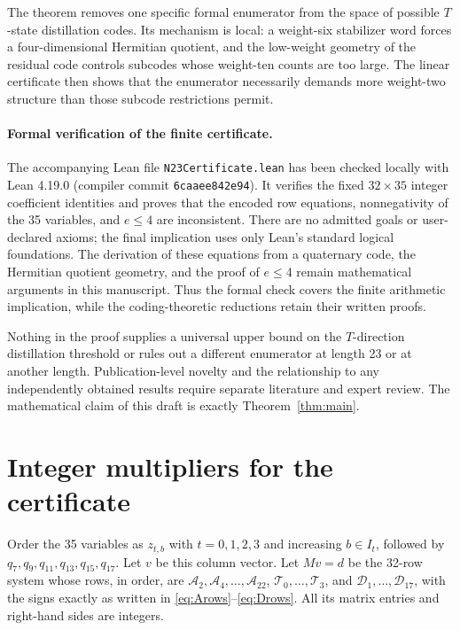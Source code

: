 \documentclass[11pt]{article}
\theoremstyle{remark}
\newcommand{\Arow}[1]{\mathcal A_{#1}}
\newcommand{\Trow}[1]{\mathcal T_{#1}}
\newcommand{\Drow}[1]{\mathcal D_{#1}}
\begin{document}
The theorem removes one specific formal enumerator from the space of
possible $T$-state distillation codes.  Its mechanism is local: a
weight-six stabilizer word forces a four-dimensional Hermitian quotient,
and the low-weight geometry of the residual code controls subcodes
whose weight-ten counts are too large.  The linear certificate then
shows that the enumerator necessarily demands more weight-two
structure than those subcode restrictions permit.

\paragraph{Formal verification of the finite certificate.}
The accompanying Lean file \texttt{N23Certificate.lean} has been checked
locally with Lean 4.19.0 (compiler commit \texttt{6caaee842e94}).
It verifies the fixed $32\times35$ integer coefficient identities and
proves that the encoded row equations, nonnegativity of the 35 variables,
and $e\leq4$ are inconsistent.  There are no admitted goals or
user-declared axioms; the final implication uses only Lean's standard
logical foundations.  The derivation of these equations from a
quaternary code, the Hermitian quotient geometry, and the proof of
$e\leq4$ remain mathematical arguments in this manuscript.
Thus the formal check covers the finite arithmetic implication,
while the coding-theoretic reductions retain their written proofs.

Nothing in the proof supplies a universal upper bound on the
$T$-direction distillation threshold or rules out a different enumerator
at length 23 or at another length.  Publication-level novelty and the
relationship to any independently obtained results require separate
literature and expert review.  The mathematical claim of this draft is
exactly Theorem~\ref{thm:main}.

\appendix
\section{Integer multipliers for the certificate}\label{app:certificate}

Order the 35 variables as $z_{t,b}$ with $t=0,1,2,3$ and increasing
$b\in I_t$, followed by $q_7,q_9,q_{11},q_{13},q_{15},q_{17}$.
Let $v$ be this column vector.  Let $Mv=d$ be the 32-row system whose
rows, in order, are $\Arow{2},\Arow{4},\ldots,\Arow{22}$,
$\Trow{0},\ldots,\Trow{3}$, and
$\Drow{1},\ldots,\Drow{17}$, with the signs exactly as written in
\eqref{eq:Arows}--\eqref{eq:Drows}.
All its matrix entries and right-hand sides are integers.
\end{document}
